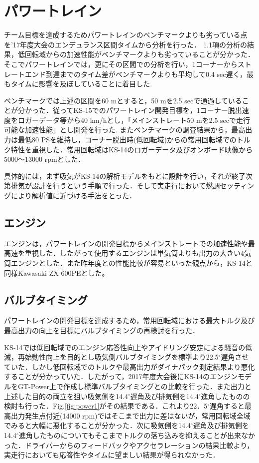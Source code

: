 \section{パワートレイン}
チーム目標を達成するためパワートレインのベンチマークよりも劣っている点を’17年度大会のエンデュランス区間タイムから分析を行った．
1.1項の分析の結果，低回転域からの加速性能がベンチマークよりも劣っていることが分かった．そこでパワートレインでは，更にその区間での分析を行い，1コーナーからストレートエンド到達までのタイム差がベンチマークよりも平均して0.4 sec遅く，最もタイムに影響を及ぼしていることに着目した.

ベンチマークでは上述の区間を60 mとすると，50 mを2.5 secで通過していることが分かった．従ってKS-15でのパワートレイン開発目標を，1コーナー脱出速度をロガーデータ等から40 km/hとし，「メインストレート50 mを2.5 secで走行可能な加速性能」とし開発を行った. 
またベンチマークの調査結果から，最高出力は最低80 PSを維持し，コーナー脱出時(低回転域)からの常用回転域でのトルク特性を重視した．常用回転域はKS-14のロガーデータ及びオンボード映像から5000～13000 rpmとした．

具体的には，まず吸気がKS-14の解析モデルをもとに設計を行い，それが終了次第排気が設計を行うという手順で行った．そして実走行において燃調セッティングにより解析値に近づける手法をとった．

\subsection{エンジン}
エンジンは，パワートレインの開発目標からメインストレートでの加速性能や最高速を重視した．したがって使用するエンジンは単気筒よりも出力の大きい4気筒エンジンとした．また昨年度との性能比較が容易といった観点から，KS-14と同様Kawasaki ZX-600PEとした。

\subsection{バルブタイミング}
パワートレインの開発目標を達成するため，常用回転域における最大トルク及び最高出力の向上を目標にバルブタイミングの再検討を行った．

KS-14では低回転域でのエンジン応答性向上やアイドリング安定による騒音の低減，再始動性向上を目的とし吸気側バルブタイミングを標準より22.5$^\circ$遅角させていた．しかし低回転域でのトルクや最高出力がダイナパック測定結果より悪化することが分かっていた．したがって，2017年度大会後にKS-14のエンジンモデルをGT-Power上で作成し標準バルブタイミングとの比較を行った．また出力と上述した目的の両立を狙い吸気側を14.4$^\circ$遅角及び排気側を14.4$^\circ$進角したものの検討も行った．Fig.\ref{fig:power1}がその結果である．これより22．5$^\circ$遅角すると最高出力発生点付近(14000 rpm)ではそこまで出力に差はないが，常用回転域全域でみると大幅に悪化することが分かった．次に吸気側を14.4$^\circ$遅角及び排気側を14.4$^\circ$進角したものについてもそこまでトルクの落ち込みを抑えることが出来なかった．ドライバーからのフィードバックやアクセラレーションの結果比較より，実走行においても応答性やタイムに望ましい結果が得られなかった．

